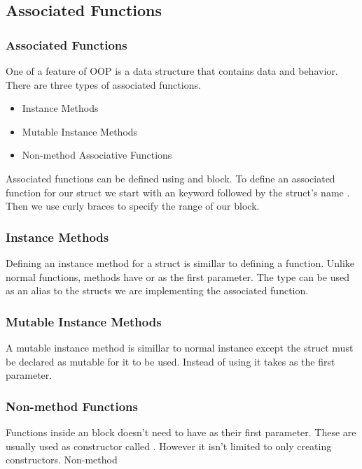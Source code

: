 \documentclass{beamer}
\begin{document}
\subsection{Associated Functions}
\begin{frame}
  \frametitle{Associated Functions}
  One of a feature of OOP is a data structure that contains data and behavior. There are three types of associated functions.
  \begin{itemize}
    \item Instance Methods
    \item Mutable Instance Methods
    \item Non-method Associative Functions
  \end{itemize}
  Associated functions can be defined using and  block. To define an associated function for our  struct we start with an  keyword followed by the struct's name . Then we use curly braces to specify the range of our block.
\end{frame}

\begin{frame}
  \frametitle{Instance Methods}
  Defining an instance method for a struct is simillar to defining a function. Unlike normal functions, methods have  or  as the first parameter. The  type can be used as an alias to the structs we are implementing the associated function.
  
\end{frame}

\begin{frame}
  \frametitle{Mutable Instance Methods}
  A mutable instance method is simillar to normal instance except the struct must be declared as mutable for it to be used. Instead of using  it takes  as the first parameter.
  
\end{frame}

\begin{frame}
  \frametitle{Non-method Functions}
  Functions inside an  block doesn't need to have  as their first parameter. These are usually used as constructor called . However it isn't limited to only creating constructors. Non-method
  
\end{frame}
\end{document}
